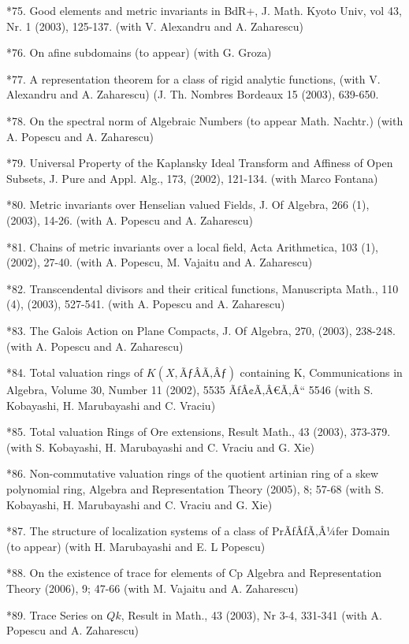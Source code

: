\documentclass[12pt]{article}
\theoremstyle{plain}
\theoremstyle{definition}
\numberwithin{equation}{section}
\begin{document}
*75.    Good elements and metric invariants in BdR+, J. Math. Kyoto Univ, vol 43, Nr. 1 (2003), 125-137. (with V. Alexandru and A. Zaharescu) 

*76.    On afine subdomains (to appear) (with G. Groza) 

*77.    A representation theorem for a class of rigid analytic functions, (with V. Alexandru and A. Zaharescu) (J. Th. Nombres Bordeaux 15 (2003), 639-650. 

*78.    On the spectral norm of Algebraic Numbers (to appear Math. Nachtr.) (with A. Popescu and A. Zaharescu) 

*79.    Universal Property of the Kaplansky Ideal Transform and Affiness of Open Subsets, J. Pure and Appl. Alg., 173, (2002), 121-134. (with Marco Fontana)
 
*80.    Metric invariants over Henselian valued Fields, J. Of Algebra, 266 (1), (2003), 14-26. (with A. Popescu and A. Zaharescu) 

*81.    Chains of metric invariants over a local field, Acta Arithmetica, 103 (1), (2002), 27-40. (with A. Popescu, M. Vajaitu and A. Zaharescu) 

*82.    Transcendental divisors and their critical functions, Manuscripta Math., 110 (4), (2003), 527-541. (with A. Popescu and A. Zaharescu) 

*83.    The Galois Action on Plane Compacts, J. Of Algebra, 270, (2003), 238-248. (with A. Popescu and A. Zaharescu) 

*84.    Total valuation rings of $K(X, ÃƒÂÃ‚Âƒ)$ containing K, Communications in Algebra, Volume 30, Number 11  (2002), 5535 ÃƒÂ¢Ã‚Â€Ã‚Â“ 5546 (with S. Kobayashi, H. Marubayashi and C. Vraciu)
 
*85.    Total valuation Rings of Ore extensions, Result Math., 43 (2003), 373-379. (with S. Kobayashi, H. Marubayashi and C. Vraciu and G. Xie)
 
*86.    Non-commutative valuation rings of the quotient artinian ring of a skew polynomial ring, Algebra and Representation Theory (2005), 8; 57-68 (with S. Kobayashi, H. Marubayashi and C. Vraciu and G. Xie)
 
*87.    The structure of localization systems of a class of PrÃƒÂƒÃ‚Â¼fer Domain (to appear) (with H. Marubayashi and E. L Popescu)
 
*88.    On the existence of trace for elements of Cp Algebra and Representation Theory (2006), 9; 47-66 (with M. Vajaitu and A. Zaharescu)
 
*89.    Trace Series on $Qk$, Result in Math., 43 (2003), Nr 3-4, 331-341 (with A. Popescu and A. Zaharescu)
 
\end{document}
